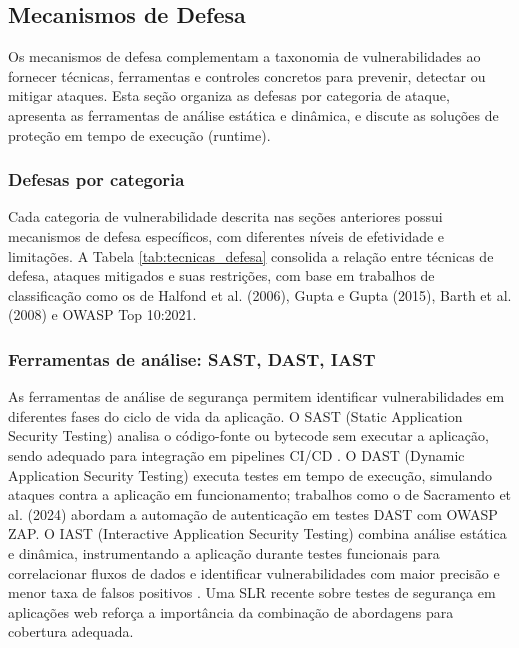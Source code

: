 \subsection{
    Mecanismos de Defesa
} \label{sec:mecanismos_defesa}

Os mecanismos de defesa complementam a taxonomia de vulnerabilidades ao fornecer técnicas, ferramentas e controles concretos para prevenir, detectar ou mitigar ataques. Esta seção organiza as defesas por categoria de ataque, apresenta as ferramentas de análise estática e dinâmica, e discute as soluções de proteção em tempo de execução (runtime).

\subsubsection{Defesas por categoria}

Cada categoria de vulnerabilidade descrita nas seções anteriores possui mecanismos de defesa específicos, com diferentes níveis de efetividade e limitações. A Tabela \ref{tab:tecnicas_defesa} consolida a relação entre técnicas de defesa, ataques mitigados e suas restrições, com base em trabalhos de classificação como os de Halfond et al. (2006), Gupta e Gupta (2015), Barth et al. (2008) e OWASP Top 10:2021.

\begin{table}[htbp]
    \caption{Técnicas de defesa por categoria de ataque e limitações}
    \label{tab:tecnicas_defesa}
    
\end{table}

\subsubsection{Ferramentas de análise: SAST, DAST, IAST}

As ferramentas de análise de segurança permitem identificar vulnerabilidades em diferentes fases do ciclo de vida da aplicação. O SAST (Static Application Security Testing) analisa o código-fonte ou bytecode sem executar a aplicação, sendo adequado para integração em pipelines CI/CD \cite{alazmi:2022}. O DAST (Dynamic Application Security Testing) executa testes em tempo de execução, simulando ataques contra a aplicação em funcionamento; trabalhos como o de Sacramento et al. (2024) abordam a automação de autenticação em testes DAST com OWASP ZAP. O IAST (Interactive Application Security Testing) combina análise estática e dinâmica, instrumentando a aplicação durante testes funcionais para correlacionar fluxos de dados e identificar vulnerabilidades com maior precisão e menor taxa de falsos positivos \cite{seth:2025}. Uma SLR recente sobre testes de segurança em aplicações web \cite{ieee:2024} reforça a importância da combinação de abordagens para cobertura adequada.

